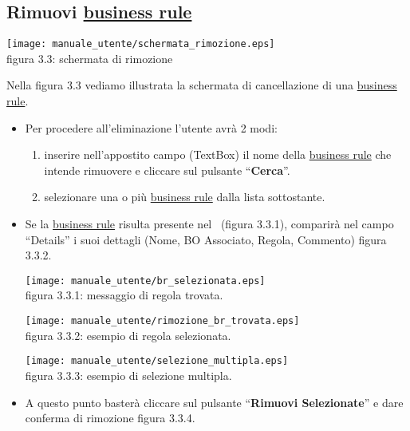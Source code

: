 \subsection{Rimuovi \underline{business rule}}
\begin{center}
\texttt{[image: manuale\_utente/schermata\_rimozione.eps]}\\
 figura 3.3: schermata di rimozione
\end{center}
Nella figura 3.3 vediamo illustrata la schermata di cancellazione di una \underline{business rule}.
\begin{itemize}
\item Per procedere all'eliminazione l'utente avr\`a 2 modi:
\begin{enumerate}
\item inserire nell'appostito campo (TextBox) il nome della \underline{business rule} che intende rimuovere e cliccare sul pulsante ``\textbf{Cerca}''.
\item selezionare una o pi\`u \underline{business rule} dalla lista sottostante.
\end{enumerate}

\item Se la \underline{business rule} risulta presente nel \rp\ (figura 3.3.1), comparir\`a  nel campo ``Details'' i suoi dettagli (Nome, BO Associato, Regola, Commento) figura 3.3.2. 

\begin{center}
\texttt{[image: manuale\_utente/br\_selezionata.eps]}\\
 figura 3.3.1: messaggio di regola trovata.
\end{center} 

\begin{center}
\texttt{[image: manuale\_utente/rimozione\_br\_trovata.eps]}\\
 figura 3.3.2: esempio di regola selezionata.
\end{center} 

\begin{center}
\texttt{[image: manuale\_utente/selezione\_multipla.eps]}\\
 figura 3.3.3: esempio di selezione multipla.
\end{center} 

\item A questo punto baster\`a cliccare sul pulsante ``\textbf{Rimuovi Selezionate}'' e dare conferma di rimozione figura 3.3.4.  
\end{itemize}

